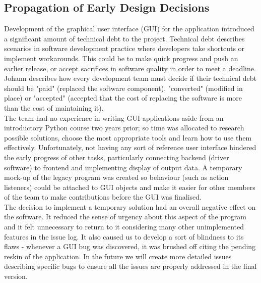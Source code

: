 \documentclass{l3proj}
\begin{document}
\subsection{Propagation of Early Design Decisions}
Development of the graphical user interface (GUI) for the application introduced a significant amount of technical debt to the project. Technical debt describes scenarios in software development practice where developers take shortcuts or implement workarounds\cite{yli-huumo}. This could be to make quick progress and push an earlier release\cite{kruchten}, or accept sacrifices in software quality in order to meet a deadline\cite{zazworka}. Johann describes how every development team must decide if their technical debt should be "paid" (replaced the software component), "converted" (modified in place) or "accepted" (accepted that the cost of replacing the software is more than the cost of maintaining it)\cite{wolff}.\\
The team had no experience in writing GUI applications aside from an introductory Python course two years prior; so time was allocated to research possible solutions, choose the most appropriate tools and learn how to use them effectively. Unfortunately, not having any sort of reference user interface hindered the early progress of other tasks, particularly connecting backend (driver software) to frontend and implementing display of output data. A temporary mock-up of the legacy program was created so behaviour (such as action listeners) could be attached to GUI objects and make it easier for other members of the team to make contributions before the GUI was finalised.\\
The decision to implement a temporary solution had an overall negative effect on the software. It reduced the sense of urgency about this aspect of the program and it felt unnecessary to return to it considering many other unimplemented features in the issue log. It also caused us to develop a sort of blindness to its flaws - whenever a GUI bug was discovered, it was brushed off citing the pending reskin of the application. In the future we will create more detailed issues describing specific bugs to ensure all the issues are properly addressed in the final version.\\
\end{document}
